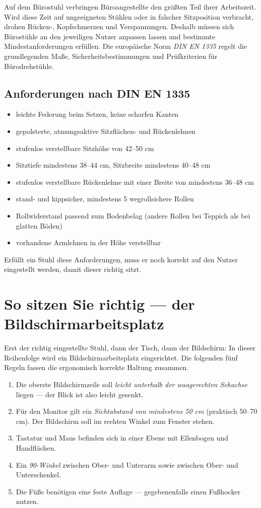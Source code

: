 \documentclass[11pt, a4paper]{article}
\begin{document}
Auf dem Bürostuhl verbringen Büroangestellte den größten Teil ihrer Arbeitszeit. Wird diese
Zeit auf ungeeigneten Stühlen oder in falscher Sitzposition verbracht, drohen Rücken-,
Kopfschmerzen und Verspannungen. Deshalb müssen sich Bürostühle an den jeweiligen Nutzer
anpassen lassen und bestimmte Mindestanforderungen erfüllen. Die europäische Norm
\emph{DIN EN 1335} regelt die grundlegenden Maße, Sicherheitsbestimmungen und Prüfkriterien
für Bürodrehstühle.

\subsection{Anforderungen nach DIN EN 1335}

\begin{itemize}
  \item leichte Federung beim Setzen, keine scharfen Kanten
  \item gepolsterte, atmungsaktive Sitzflächen- und Rückenlehnen
  \item stufenlos verstellbare Sitzhöhe von 42--50 cm
  \item Sitztiefe mindestens 38--44 cm, Sitzbreite mindestens 40--48 cm
  \item stufenlos verstellbare Rückenlehne mit einer Breite von mindestens 36--48 cm
  \item stand- und kippsicher, mindestens 5 wegrollsichere Rollen
  \item Rollwiderstand passend zum Bodenbelag (andere Rollen bei Teppich als bei glatten Böden)
  \item vorhandene Armlehnen in der Höhe verstellbar
\end{itemize}

Erfüllt ein Stuhl diese Anforderungen, muss er noch korrekt auf den Nutzer eingestellt
werden, damit dieser richtig sitzt.

\section{So sitzen Sie richtig --- der Bildschirmarbeitsplatz}

Erst der richtig eingestellte Stuhl, dann der Tisch, dann der Bildschirm: In dieser
Reihenfolge wird ein Bildschirmarbeitsplatz eingerichtet. Die folgenden fünf Regeln fassen
die ergonomisch korrekte Haltung zusammen.

\begin{enumerate}
  \item Die oberste Bildschirmzeile soll \emph{leicht unterhalb der waagerechten Sehachse}
    liegen --- der Blick ist also leicht gesenkt.
  \item Für den Monitor gilt ein \emph{Sichtabstand von mindestens 50 cm} (praktisch
    50--70 cm). Der Bildschirm soll im rechten Winkel zum Fenster stehen.
  \item Tastatur und Maus befinden sich in einer Ebene mit Ellenbogen und Handflächen.
  \item Ein \emph{90\textdegree-Winkel} zwischen Ober- und Unterarm sowie zwischen Ober-
    und Unterschenkel.
  \item Die Füße benötigen eine feste Auflage --- gegebenenfalls einen Fußhocker nutzen.
\end{enumerate}
\end{document}

